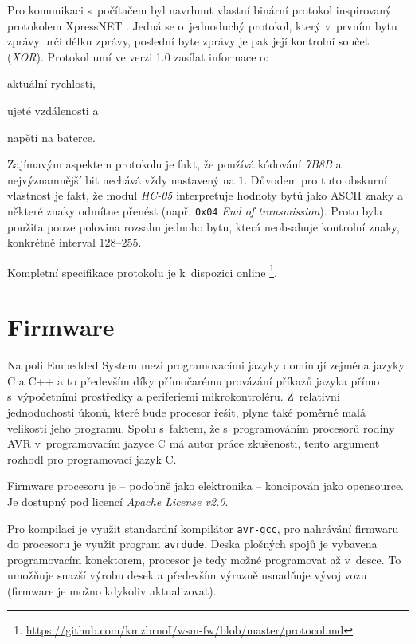 Pro komunikaci s~počítačem byl navrhnut vlastní binární protokol inspirovaný
protokolem XpressNET \cite{xpressnet-specs}. Jedná se o~jednoduchý protokol, který
v~prvním bytu zprávy určí délku zprávy, poslední byte zprávy je pak její
kontrolní součet (\textit{XOR}). Protokol umí ve verzi 1.0 zasílat informace o:

\begin{compactenum}
\item aktuální rychlosti,
\item ujeté vzdálenosti a
\item napětí na baterce.
\end{compactenum}

Zajímavým aspektem protokolu je fakt, že používá kódování \textit{7B8B} a
nejvýznamnější bit nechává vždy nastavený na $1$. Důvodem pro tuto obskurní
vlastnost je fakt, že modul \textit{HC-05} interpretuje hodnoty bytů jako
ASCII znaky a některé znaky odmítne přenést (např. \texttt{0x04} \textit{End
of transmission}). Proto byla použita pouze polovina rozsahu jednoho
bytu, která neobsahuje kontrolní znaky, konkrétně interval $128$--$255$.

Kompletní specifikace protokolu je k~dispozici online
\footnote{\url{https://github.com/kmzbrnoI/wsm-fw/blob/master/protocol.md}}.

\section{Firmware}
\label{sec:wsm-fw}

Na poli Embedded System mezi programovacími jazyky dominují zejména jazyky C a
C++ a to především díky přímočarému provázání příkazů jazyka přímo
s~výpočetními prostředky a periferiemi mikrokontroléru. Z~relativní
jednoduchosti úkonů, které bude procesor řešit, plyne také poměrně malá
velikosti jeho programu. Spolu s~faktem, že s~programováním procesorů rodiny
AVR v~programovacím jazyce C má autor práce zkušenosti, tento argument rozhodl
pro programovací jazyk C.

Firmware procesoru je -- podobně jako elektronika -- koncipován jako
opensource. Je dostupný \cite{wsm-fw} pod licencí \textit{Apache License v2.0}.

Pro kompilaci je využit standardní kompilátor \texttt{avr-gcc}, pro nahrávání
firmwaru do procesoru je využit program \texttt{avrdude}. Deska
plošných spojů je vybavena programovacím konektorem, procesor je tedy možné
programovat až v~desce. To umožňuje snazší výrobu desek a především výrazně
usnadňuje vývoj vozu (firmware je možno kdykoliv aktualizovat).

